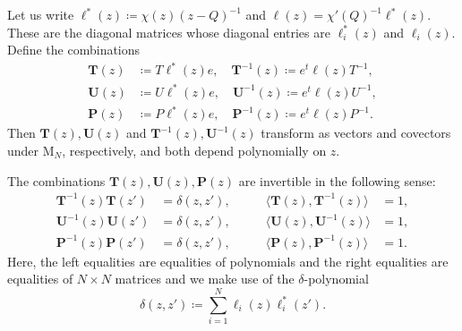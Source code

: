 \begin{definition}
Let us write $\ell^*(z) \coloneq \chi(z) (z-Q)^{-1}$ and $\ell(z) = \chi'(Q)^{-1} \ell^*(z)$. These are the diagonal matrices whose diagonal entries are $\ell_i^*(z)$ and $\ell_i(z)$. Define the combinations
\begin{equation}
\begin{aligned}
\mathbf{T}(z) &\coloneq T \ell^*(z) e, \quad \mathbf{T}^{-1}(z) \coloneq e^t \ell(z) T^{-1}, \\
\mathbf{U}(z) &\coloneq U \ell^*(z) e, \quad \mathbf{U}^{-1}(z) \coloneq e^t \ell(z) U^{-1}, \\
\mathbf{P}(z) &\coloneq P \ell^*(z) e, \quad \mathbf{P}^{-1}(z) \coloneq e^t \ell(z) P^{-1}.
\end{aligned}
\end{equation}
Then $\mathbf{T}(z),\mathbf{U}(z)$ and $\mathbf{T}^{-1}(z),\mathbf{U}^{-1}(z)$ transform as vectors and covectors under $\mathrm{M}_N$, respectively, and both depend polynomially on $z$.
\end{definition}

\begin{remark}
The combinations $\mathbf{T}(z),\mathbf{U}(z),\mathbf{P}(z)$ are invertible in the following sense:
\begin{equation}
\begin{aligned}
\mathbf{T}^{-1}(z) \mathbf{T}(z') &= \delta(z,z'), \\
\mathbf{U}^{-1}(z) \mathbf{U}(z') &= \delta(z,z'), \\
\mathbf{P}^{-1}(z) \mathbf{P}(z') &= \delta(z,z'),
\end{aligned}
\qquad
\begin{aligned}
\langle \mathbf{T}(z), \mathbf{T}^{-1}(z) \rangle &= 1, \\
\langle \mathbf{U}(z), \mathbf{U}^{-1}(z) \rangle &= 1, \\
\langle \mathbf{P}(z), \mathbf{P}^{-1}(z) \rangle &= 1.
\end{aligned}
\end{equation}
Here, the left equalities are equalities of polynomials and the right equalities are equalities of $N \times N$ matrices and we make use of the $\delta$-polynomial
\begin{equation}
\delta(z,z') \coloneq \sum_{i=1}^N \ell_i(z) \ell_i^*(z').
\end{equation}
\end{remark}

